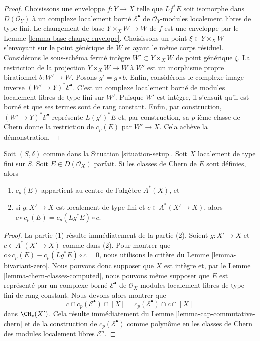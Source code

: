 \begin{proof}
Choisissons une enveloppe $f : Y \to X$ telle que $Lf^*E$ soit isomorphe dans
$D(\mathcal{O}_Y)$ à un complexe localement borné $\mathcal{E}^\bullet$
de $\mathcal{O}_Y$-modules localement libres de type fini. Le changement de base
$Y \times_X W \to W$ de $f$ est une enveloppe par le
Lemme \ref{lemma-base-change-envelope}. Choisissons un point
$\xi \in Y \times_X W$ s'envoyant sur le point générique de $W$
et ayant le même corps résiduel. Considérons le sous-schéma fermé intègre
$W' \subset Y \times_X W$ de point générique $\xi$. La restriction
de la projection $Y \times_X W \to W$ à $W'$ est un morphisme propre
birationnel $b : W' \to W$. Posons $g' = g \circ b$. Enfin, considérons le complexe
image inverse $(W' \to Y)^*\mathcal{E}^\bullet$. C'est un complexe localement borné
de modules localement libres de type fini sur $W'$. Puisque $W'$ est intègre,
il s'ensuit qu'il est borné et que ses termes sont de rang constant.
Enfin, par construction, $(W' \to Y)^*\mathcal{E}^\bullet$
représente $L(g')^*E$ et, par construction, sa $p$-ième classe de Chern
donne la restriction de $c_p(E)$ par $W' \to X$. Cela achève la démonstration.
\end{proof}

\begin{lemma}
\label{lemma-commutative-chern-perfect}
Soit $(S, \delta)$ comme dans la Situation \ref{situation-setup}.
Soit $X$ localement de type fini sur $S$.
Soit $E \in D(\mathcal{O}_X)$ parfait. Si les classes de Chern
de $E$ sont définies, alors
\begin{enumerate}
\item $c_p(E)$ appartient au centre de l'algèbre $A^*(X)$, et
\item si $g : X' \to X$ est localement de type fini et $c \in A^*(X' \to X)$,
alors $c \circ c_p(E) = c_p(Lg^*E) \circ c$.
\end{enumerate}
\end{lemma}

\begin{proof}
La partie (1) résulte immédiatement de la partie (2). Soient $g : X' \to X$ et
$c \in A^*(X' \to X)$ comme dans (2). Pour montrer que
$c \circ c_p(E) - c_p(Lg^*E) \circ c = 0$, nous utilisons le critère du
Lemme \ref{lemma-bivariant-zero}. Nous pouvons donc supposer que $X$
est intègre et, par le Lemme \ref{lemma-chern-classes-computed},
nous pouvons même supposer que $E$ est représenté
par un complexe borné $\mathcal{E}^\bullet$
de $\mathcal{O}_X$-modules localement libres de type fini de rang constant.
Nous devons alors montrer que
$$
c \cap c_p(\mathcal{E}^\bullet) \cap [X] =
c_p(\mathcal{E}^\bullet) \cap c \cap [X] 
$$
dans $\CH_*(X')$. Cela résulte immédiatement du
Lemme \ref{lemma-cap-commutative-chern} et de la construction
de $c_p(\mathcal{E}^\bullet)$ comme polynôme en les
classes de Chern des modules localement libres $\mathcal{E}^n$.
\end{proof}

